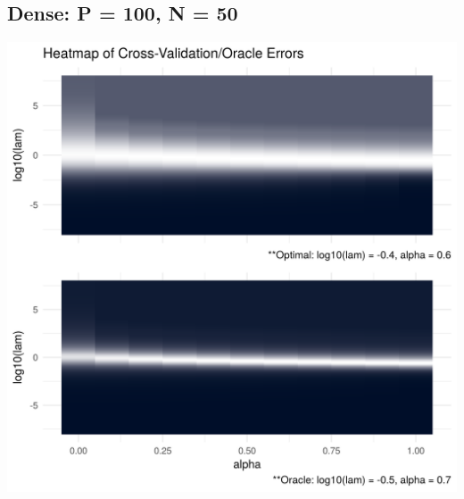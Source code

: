 \documentclass[12pt,]{book}
\theoremstyle{definition}
\theoremstyle{definition}
\theoremstyle{definition}
\theoremstyle{remark}
\begin{document}
\newpage

\hypertarget{dense-p-100-n-50}{%
\subsection{Dense: P = 100, N = 50}\label{dense-p-100-n-50}}

\includegraphics{images/repsKLdenseQR_N50_P100.png}

\vspace{0.5cm}
\end{document}
